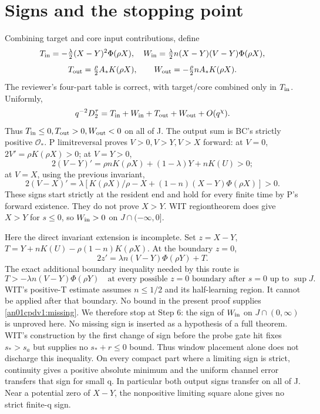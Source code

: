 \documentclass[11pt]{article}
\begin{document}
\section{Signs and the stopping point}\label{an01cpdv1:signs}
Combining target and core input contributions, define
\[
T_{\rm in}=-\tfrac\lambda2(X-Y)^2\Phi(\rho X),\quad
W_{\rm in}=\tfrac\lambda2 n(X-Y)(V-Y)\Phi(\rho X),
\]
\[
T_{\rm out}=\tfrac\rho2 A_*K(\rho X),\qquad
W_{\rm out}=-\tfrac\rho2 nA_*K(\rho X).
\]
The reviewer's four-part table is correct, with target/core combined
only in \(T_{\rm in}\). Uniformly,
\[
q^{-2}D_2^\tau=T_{\rm in}+W_{\rm in}+T_{\rm out}+W_{\rm out}
 +O(q^\chi).
\]
Thus \(T_{\rm in}\le0,T_{\rm out}>0,W_{\rm out}<0\) on all of J.
The output sum is BC's strictly positive \(\mathcal O_*\).
P limitreversal proves \(V>0,V>Y,V>X\) forward: at \(V=0\),
\(2V'=\rho K(\rho X)>0\); at \(V=Y>0\),
\[
2(V-Y)'=\rho nK(\rho X)+(1-\lambda)Y+nK(U)>0;
\]
at \(V=X\), using the previous invariant,
\[
2(V-X)'=\lambda[K(\rho X)/\rho-X+
                       (1-n)(X-Y)\Phi(\rho X)]>0.
\]
These signs start strictly at the resident end and hold for every finite
time by P's forward existence. They do not prove \(X>Y\).
WIT regiontheorem does give \(X>Y\) for \(s\le0\), so
\(W_{\rm in}>0\) on \(J\cap(-\infty,0]\).

Here the direct invariant extension is incomplete. Set \(z=X-Y\),
\(T=Y+nK(U)-\rho(1-n)K(\rho X)\). At the boundary \(z=0\),
\[
2z'=\lambda n(V-Y)\Phi(\rho Y)+T.
\]
The exact additional boundary inequality needed by this route is
\begin{equation}\label{an01cpdv1:missing}
T>-\lambda n(V-Y)\Phi(\rho Y)\quad\text{at every possible }
z=0\text{ boundary after }s=0\text{ up to }\sup J.
\end{equation}
WIT's positive-T estimate assumes \(n\le1/2\) and its half-learning
region. It cannot be applied after that boundary. No bound in the
present proof supplies \eqref{an01cpdv1:missing}.
We therefore stop at Step 6: the sign of \(W_{\rm in}\) on
\(J\cap(0,\infty)\) is unproved here. No missing sign is inserted as
a hypothesis of a full theorem. WIT's construction by the first change of sign before
the probe gate hit fixes \(s_*>s_a\) but supplies no
\(s_*+r\le0\) bound. Thus window placement alone does not discharge
this inequality. On every compact part where a limiting sign is strict,
continuity gives a positive absolute minimum and the uniform channel
error transfers that sign for small q. In particular both output signs
transfer on all of J. Near a potential zero of \(X-Y\), the
nonpositive limiting square alone gives no strict finite-q sign.
\end{document}
